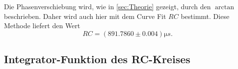 Die Phasenverschiebung wird, wie in \autoref{sec:Theorie} gezeigt, durch den $\arctan$ beschrieben.
Daher wird auch hier mit dem Curve Fit $RC$ bestimmt. Diese Methode liefert den Wert
\begin{equation}
	RC = (891.7860 \pm 0.004) \si{\micro s}.
	\label{eqn:ergebniss-4c}
\end{equation}

\subsection{Integrator-Funktion des RC-Kreises}
\label{sec:4d-auswertung}


